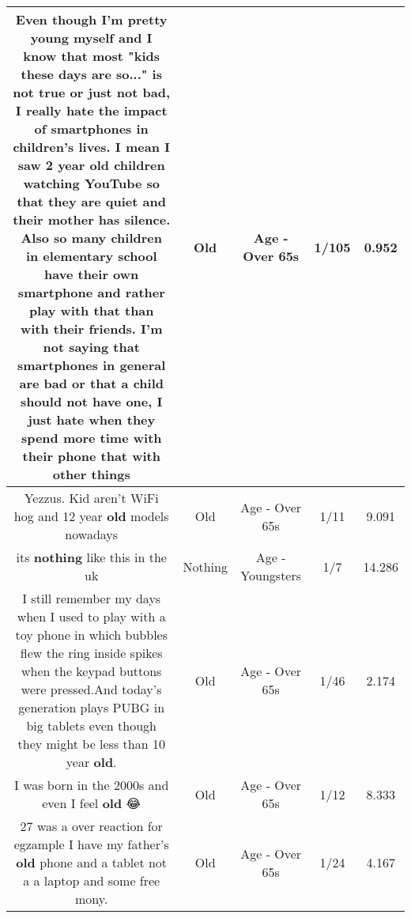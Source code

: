 \documentclass[11pt]{article}
\newlength\mylength
\begin{document}
\begin{center}
\begin{longtable}{|C{.65\mylength}|C{.30\mylength}|C{.12\mylength}|C{.12\mylength}|C{.12\mylength}|}
  \small Even though I'm pretty young myself and I know that most "kids these days are so..." is not true or just not bad, I really hate the impact of smartphones in children's lives. I mean I saw 2 year \textbf{old} children watching YouTube so that they are quiet and their mother has silence. Also so many children in elementary school have their own smartphone and rather play with that than with their friends. I'm not saying that smartphones in general are bad or that a child should not have one, I just hate when they spend more time with their phone that with other things\normalsize   & Old & Age - Over 65s & 1/105 & 0.952 \\  \hline
  \small Yezzus. Kid aren't WiFi hog and 12 year \textbf{old} models nowadays\normalsize   & Old & Age - Over 65s & 1/11 & 9.091 \\  \hline
  \small its \textbf{nothing} like this in the uk\normalsize   & Nothing & Age - Youngsters & 1/7 & 14.286 \\  \hline
  \small I still remember my days when I used to play with a toy phone in which bubbles flew the ring inside spikes when the keypad buttons were pressed.And today's generation plays PUBG in big tablets even though they might be less than 10 year \textbf{old}.\normalsize   & Old & Age - Over 65s & 1/46 & 2.174 \\  \hline
  \small I was born in the 2000s and even I feel \textbf{old} 😂\normalsize   & Old & Age - Over 65s & 1/12 & 8.333 \\  \hline
  \small 27 was a over reaction for egzample I have my father's \textbf{old} phone and a tablet not a a laptop and some free mony.\normalsize   & Old & Age - Over 65s & 1/24 & 4.167 \\  \hline

\end{longtable}
\end{center}
\end{document}
